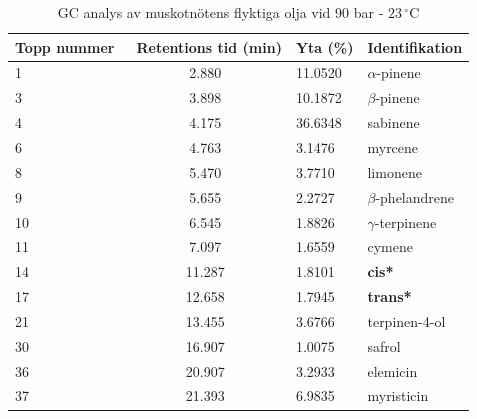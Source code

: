 \documentclass[a4paper,margin=3.25cm]{article}
\begin{document}
\begin{table}[!htbp]
\small
\centering
\caption{GC analys av muskotnötens flyktiga olja vid 90 bar - $23\,^{\circ}\mathrm{C}$}
\begin{tabular*}{\textwidth}{l @{\extracolsep{\fill}} @{}cll@{}}
\toprule
Topp nummer & \ Retentions tid (min) & Yta (\%) & Identifikation                                      \\ \midrule
1           & 2.880                & 11.0520   & $\alpha$-pinene                                      \\
3           & 3.898                & 10.1872   & $\beta$-pinene                                       \\
4           & 4.175                & 36.6348   & sabinene                                            \\
6           & 4.763                & 3.1476    & myrcene                                             \\
8           & 5.470                & 3.7710    & limonene                                            \\
9           & 5.655                & 2.2727    & $\beta$-phelandrene                                  \\
10          & 6.545                & 1.8826    & $\gamma$-terpinene                                   \\
11          & 7.097                & 1.6559    & cymene                                              \\
14          & 11.287               & 1.8101    & \textbf{cis*}   \\
17          & 12.658               & 1.7945    & \textbf{trans*} \\
21          & 13.455               & 3.6766    & terpinen-4-ol                                       \\
30          & 16.907               & 1.0075    & safrol                                              \\
36          & 20.907               & 3.2933    & elemicin                                            \\
37          & 21.393               & 6.9835    & myristicin                                          \\ \bottomrule
\end{tabular*}

\end{table}
\end{document}
